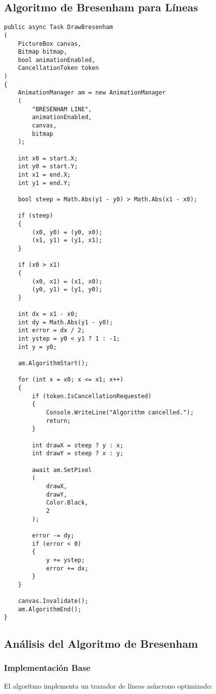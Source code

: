 \documentclass[12pt]{article}
\begin{document}
\subsection{Algoritmo de Bresenham para Líneas}
\begin{lstlisting}
public async Task DrawBresenham
(
    PictureBox canvas,
    Bitmap bitmap,
    bool animationEnabled,
    CancellationToken token
)
{
    AnimationManager am = new AnimationManager
    (
        "BRESENHAM LINE",
        animationEnabled,
        canvas,
        bitmap
    );

    int x0 = start.X;
    int y0 = start.Y;
    int x1 = end.X;
    int y1 = end.Y;

    bool steep = Math.Abs(y1 - y0) > Math.Abs(x1 - x0);

    if (steep)
    {
        (x0, y0) = (y0, x0);
        (x1, y1) = (y1, x1);
    }

    if (x0 > x1)
    {
        (x0, x1) = (x1, x0);
        (y0, y1) = (y1, y0);
    }

    int dx = x1 - x0;
    int dy = Math.Abs(y1 - y0);
    int error = dx / 2;
    int ystep = y0 < y1 ? 1 : -1;
    int y = y0;

    am.AlgorithmStart();

    for (int x = x0; x <= x1; x++)
    {
        if (token.IsCancellationRequested)
        {
            Console.WriteLine("Algorithm cancelled.");
            return;
        }

        int drawX = steep ? y : x;
        int drawY = steep ? x : y;

        await am.SetPixel
        (
            drawX,
            drawY,
            Color.Black,
            2
        );

        error -= dy;
        if (error < 0)
        {
            y += ystep;
            error += dx;
        }
    }

    canvas.Invalidate();
    am.AlgorithmEnd();
}
\end{lstlisting}

\subsection{Análisis del Algoritmo de Bresenham}

\subsubsection{Implementación Base}
El algoritmo implementa un trazador de líneas asíncrono optimizado:
\end{document}
